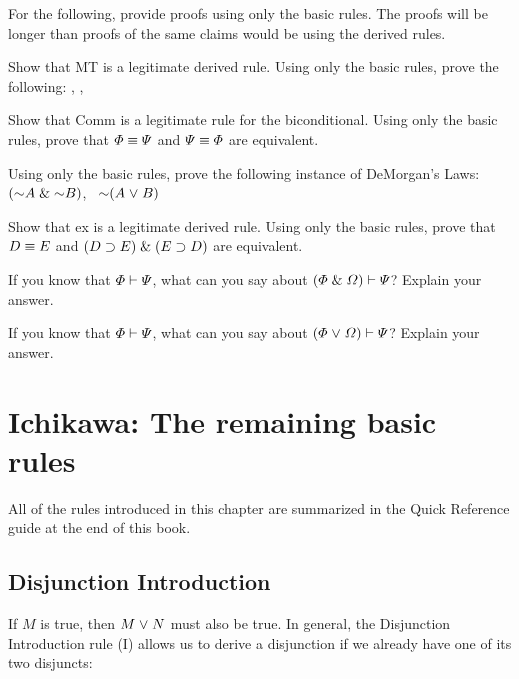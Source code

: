 \problempart
For the following, provide proofs using only the basic rules. The proofs will be longer than proofs of the same claims would be using the derived rules.
\begin{earg}
\item Show that MT is a legitimate derived rule. Using only the basic rules, prove the following: \metaA{}\eif\metaB{}, \enot\metaB{}, \therefore\ \enot\metaA{}
\item Show that Comm is a legitimate rule for the biconditional. Using only the basic rules, prove that $\varPhi{}\equiv\varPsi{}$ and $\varPsi{}\equiv\varPhi{}$ are equivalent.
\item Using only the basic rules, prove the following instance of DeMorgan's Laws: $(\enot A \eand \enot B)$, \therefore\ $\enot(A \eor B)$
\item Show that {\eiff}{ex} is a legitimate derived rule. Using only the basic rules, prove that $D\equiv E$ and $(D\supset E)\mathrel\&(E\supset D)$ are equivalent.
\end{earg}




\problempart
\begin{earg}
\item If you know that $\varPhi{}\vdash\varPsi{}$, what can you say about $(\varPhi{}\mathrel\&\varOmega{})\vdash\varPsi{}$? Explain your answer.
\item If you know that $\varPhi{}\vdash\varPsi{}$, what can you say about $(\varPhi{}\mkern1mu\vee\mkern1mu\varOmega{})\vdash\varPsi{}$? Explain your answer.
\end{earg}






\section{Ichikawa: The remaining basic rules}

All of the rules introduced in this chapter are summarized in the Quick Reference guide at the end of this book.

\subsection{Disjunction Introduction}
If $M$ is true, then $M \mkern1mu\vee\mkern1mu N$ must also be true. In general, the Disjunction Introduction rule ({\eor}I) allows us to derive a disjunction if we already have one of its two disjuncts:

